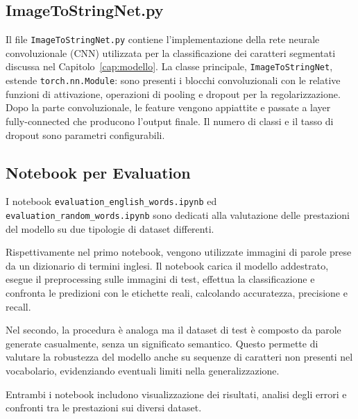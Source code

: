 \subsection{ImageToStringNet.py}
Il file \texttt{ImageToStringNet.py} contiene l’implementazione della rete neurale convoluzionale (CNN) utilizzata per la classificazione dei caratteri segmentati discussa nel Capitolo~\ref{cap:modello}. La classe principale, \texttt{ImageToStringNet}, estende \texttt{torch.nn.Module}: sono presenti i blocchi convoluzionali con le relative funzioni di attivazione, operazioni di pooling e dropout per la regolarizzazione. Dopo la parte convoluzionale, le feature vengono appiattite e passate a layer fully-connected che producono l’output finale. Il numero di classi e il tasso di dropout sono parametri configurabili. 

\subsection{Notebook per Evaluation}
I notebook \texttt{evaluation\_english\_words.ipynb} ed \\  \texttt{evaluation\_random\_words.ipynb} sono dedicati alla valutazione delle prestazioni del modello su due tipologie di dataset differenti. 

Rispettivamente nel primo notebook, vengono utilizzate immagini di parole prese da un dizionario di termini inglesi. Il notebook carica il modello addestrato, esegue il preprocessing sulle immagini di test, effettua la classificazione e confronta le predizioni con le etichette reali, calcolando accuratezza, precisione e recall.

Nel secondo, la procedura è analoga ma il dataset di test è composto da parole generate casualmente, senza un significato semantico. Questo permette di valutare la robustezza del modello anche su sequenze di caratteri non presenti nel vocabolario, evidenziando eventuali limiti nella generalizzazione.

Entrambi i notebook includono visualizzazione dei risultati, analisi degli errori e confronti tra le prestazioni sui diversi dataset.

